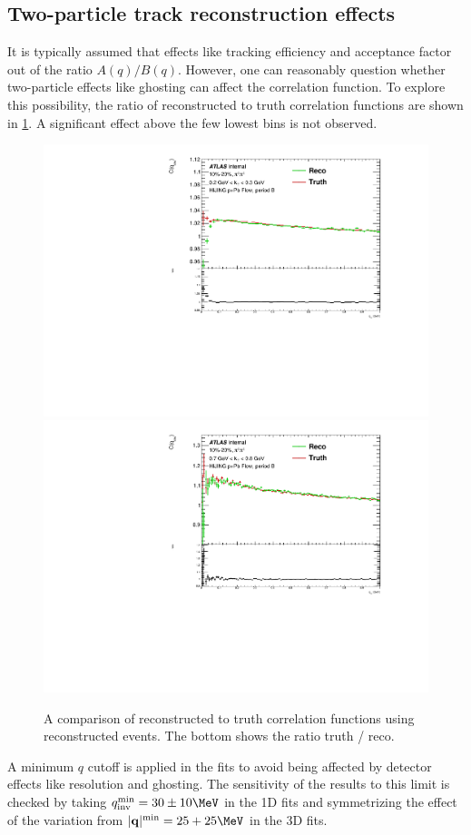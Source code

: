 \subsection{Two-particle track reconstruction effects}
It is typically assumed that effects like tracking efficiency and acceptance factor out of the ratio $A(q) / B(q)$.
However, one can reasonably question whether two-particle effects like ghosting can affect the correlation function.
To explore this possibility, the ratio of reconstructed to truth correlation functions are shown in \cref{fig:2pc_effects}.
A significant effect above the few lowest \qinv bins is not observed.

\begin{figure}[t]
\begin{minipage}[t]{1.0\textwidth}
\centering
\includegraphics[width=.49\linewidth]{Cqinv_hijing_reco_vs_truth_cent3_e3_kt1.pdf}
\includegraphics[width=.49\linewidth]{Cqinv_hijing_reco_vs_truth_cent3_e3_kt6.pdf}
\end{minipage}
\caption{A comparison of reconstructed to truth correlation functions using reconstructed \Hijing events.
The bottom shows the ratio truth / reco.}
\label{fig:2pc_effects}
\end{figure}

A minimum $q$ cutoff is applied in the fits to avoid being affected by detector effects like resolution and ghosting.
The sensitivity of the results to this limit is checked by taking $\qinv^\textrm{min} = 30 \pm 10 \MeV$ in the 1D fits and symmetrizing the effect of the variation from $|\mathbf{q}|^\textrm{min} = 25 + 25 \MeV$ in the 3D fits.

